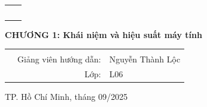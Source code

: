 \begin{titlepage}
\begin{center}
\begin{tabular}{c}
~~\\
\end{tabular}
\end{center}
\begin{center}
{\textbf{{\huge CHƯƠNG 1: Khái niệm và hiệu suất máy tính }}}\\
\end{center}


\begin{center}
\begin{table}[h]
\large
    \begin{tabular}{rrl}
        \hspace{2.5 cm} &  &\\
        
        & Giảng viên hướng dẫn: & Nguyễn Thành Lộc\\[0.2cm]
        & Lớp: & L06\\[0.2cm]
    \end{tabular}
\end{table}
\end{center}
\vspace{2cm}
\centerline{\large TP. Hồ Chí Minh, tháng 09/2025}
\end{titlepage}